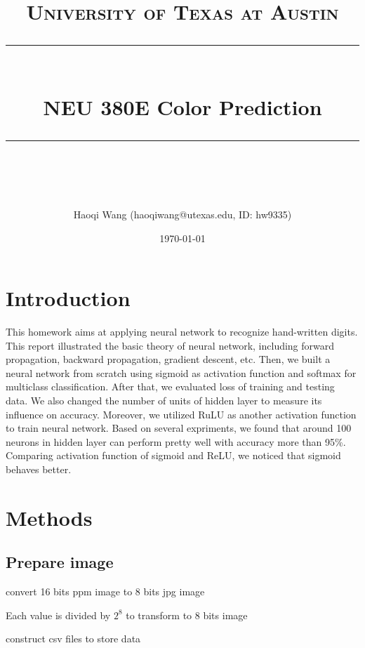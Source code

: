 \documentclass[11pt]{scrartcl} %
\title{	
	\normalfont\normalsize
	\textsc{University of Texas at Austin}\\ %
	\vspace{25pt} %
	\rule{\linewidth}{0.5pt}\\ %
	\vspace{20pt} %
	{\huge NEU 380E Color Prediction}\\ %
	\vspace{12pt} %
	\rule{\linewidth}{2pt}\\ %
	\vspace{12pt} %
}
\author{\LARGE Haoqi Wang (haoqiwang@utexas.edu, ID: hw9335)} %
\date{\normalsize\today} %
\begin{document}
\maketitle %


\section{Introduction}

This homework aims at applying neural network to recognize hand-written digits. This report illustrated the basic theory of neural network, including forward propagation, backward propagation, gradient descent, etc. Then, we built a neural network from scratch using sigmoid as activation function and softmax for multiclass classification. After that, we evaluated loss of training and testing data. We also changed the number of units of hidden layer to measure its influence on accuracy. Moreover, we utilized RuLU as another activation function to train neural network. Based on several expriments, we found that around 100 neurons in hidden layer can perform pretty well with accuracy more than 95\%. Comparing activation function of sigmoid and ReLU, we noticed that sigmoid behaves better.




%


\section{Methods}

\subsection{Prepare image}
convert 16 bits ppm image to 8 bits jpg image

Each value is divided by $2^8$ to transform to 8 bits image

construct csv files to store data
\end{document}

